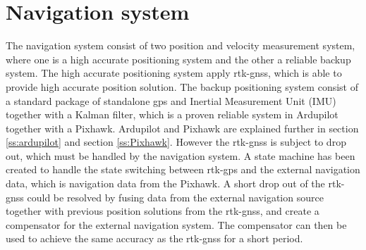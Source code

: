 \section{Navigation system}
The navigation system consist of two position and velocity measurement system, where one is a high accurate positioning system and the other a reliable backup system. The high accurate positioning system apply \gls{rtk-gnss}, which is able to provide high accurate position solution. The backup positioning system consist of a standard package of standalone \gls{gps} and Inertial Measurement Unit (IMU) together with a Kalman filter, which is a proven reliable system in Ardupilot together with a Pixhawk. Ardupilot and Pixhawk are explained further in section \ref{ss:ardupilot} and section \ref{ss:Pixhawk}. However the \gls{rtk-gnss} is subject to drop out, which must be handled by the navigation system. A state machine has been created to handle the state switching between \gls{rtk-gps} and the external navigation data, which is navigation data from the Pixhawk. A short drop out of the \gls{rtk-gnss} could be resolved by fusing data from the external navigation source together with previous position solutions from the \gls{rtk-gnss}, and create a compensator for the external navigation system. The compensator can then be used to achieve the same accuracy as the \gls{rtk-gnss} for a short period.
